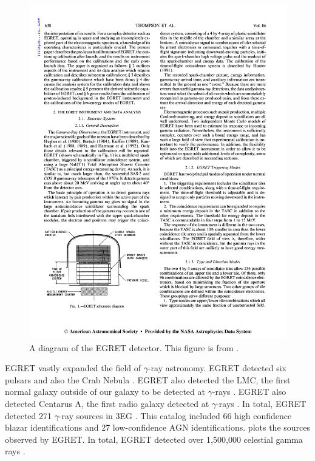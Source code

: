 \begin{figure}[htbp]
\centering
\includegraphics{chapters/introduction/figures/egret_detector.pdf}
\caption{A diagram of the \ac{EGRET} detector.  This figure is from
\citep{thompson_1993a_calibration-energetic}.}
\end{figure}

\ac{EGRET} vastly expanded the field of $\gamma$-ray astronomy.
\ac{EGRET} detected six pulsars \citep{nolan_1996a_egret-observations} and
also the Crab Nebula \citep{nolan_1993a_observations-pulsar}.  \ac{EGRET}
also detected the LMC, the first normal galaxy outside of our galaxy to be
detected at $\gamma$-rays \citep{sreekumar_1992a_observations-large}.
\ac{EGRET} also detected Centarus A, the first radio galaxy
detected at $\gamma$-rays \citep{sreekumar_1999a_emission-nearby}.
In total, EGRET detected 271 $\gamma$-ray sources in \ac{3EG}
\citep{hartman_1999a_third-egret}. This catalog included 66
high confidence blazar identifications and 27 low-confidence AGN
identifications.  plots the sources
observed by \ac{EGRET}.  In total, \ac{EGRET} detected over 1,500,000
celestial gamma rays \citep{thompson_2008a_gamma-astrophysics:}.

